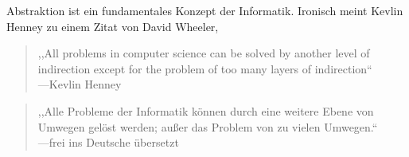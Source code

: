Abstraktion ist ein fundamentales Konzept der Informatik. Ironisch meint
Kevlin Henney zu einem Zitat von David Wheeler,
\begin{quotation}
  ,,All problems in computer science can be solved by another level
  of indirection except for the problem of too many layers of indirection`` \\
  ---Kevlin Henney
\end{quotation}
\begin{quotation}
  ,,Alle Probleme der Informatik können durch eine weitere Ebene von Umwegen
  gelöst werden; außer das Problem von zu vielen Umwegen.`` \\
  ---frei ins Deutsche übersetzt
\end{quotation}
